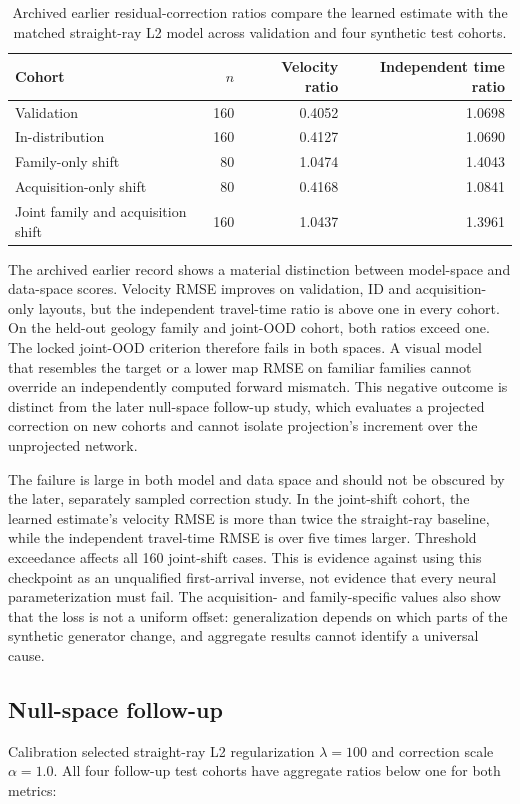 \documentclass[11pt]{article}
\begin{document}
\begin{table}[htbp]
\centering
\caption{Archived earlier residual-correction ratios compare the learned estimate with the matched straight-ray L2 model across validation and four synthetic test cohorts.}
\label{tab:cnn-failure}
\small
\begin{tabular}{lrrr}
\toprule
Cohort & $n$ & Velocity ratio & Independent time ratio \\
\midrule
Validation & 160 & 0.4052 & 1.0698 \\
In-distribution & 160 & 0.4127 & 1.0690 \\
Family-only shift & 80 & 1.0474 & 1.4043 \\
Acquisition-only shift & 80 & 0.4168 & 1.0841 \\
Joint family and acquisition shift & 160 & 1.0437 & 1.3961 \\
\bottomrule
\end{tabular}
\end{table}

The archived earlier record shows a material distinction between model-space and data-space scores. Velocity RMSE improves on validation, ID and acquisition-only layouts, but the independent travel-time ratio is above one in every cohort. On the held-out geology family and joint-OOD cohort, both ratios exceed one. The locked joint-OOD criterion therefore fails in both spaces. A visual model that resembles the target or a lower map RMSE on familiar families cannot override an independently computed forward mismatch. This negative outcome is distinct from the later null-space follow-up study, which evaluates a projected correction on new cohorts and cannot isolate projection's increment over the unprojected network.

The failure is large in both model and data space and should not be obscured by the later, separately sampled correction study. In the joint-shift cohort, the learned estimate's velocity RMSE is more than twice the straight-ray baseline, while the independent travel-time RMSE is over five times larger. Threshold exceedance affects all 160 joint-shift cases. This is evidence against using this checkpoint as an unqualified first-arrival inverse, not evidence that every neural parameterization must fail. The acquisition- and family-specific values also show that the loss is not a uniform offset: generalization depends on which parts of the synthetic generator change, and aggregate results cannot identify a universal cause.

\subsection{Null-space follow-up}
Calibration selected straight-ray L2 regularization $\lambda=100$ and correction scale $\alpha=1.0$. All four follow-up test cohorts have aggregate ratios below one for both metrics:
\end{document}

